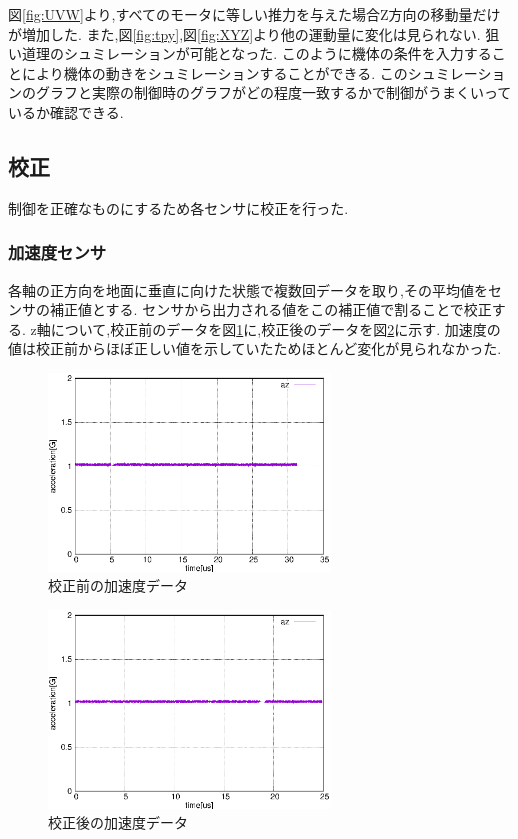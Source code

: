 \documentclass[12pt,oneside]{sotsuken_paper}
\begin{document}
図\ref{fig:UVW}より,すべてのモータに等しい推力を与えた場合Z方向の移動量だけが増加した.
また,図\ref{fig:tpy},図\ref{fig:XYZ}より他の運動量に変化は見られない.
狙い道理のシュミレーションが可能となった.
このように機体の条件を入力することにより機体の動きをシュミレーションすることができる.
このシュミレーションのグラフと実際の制御時のグラフがどの程度一致するかで制御がうまくいっているか確認できる.

\subsection{校正}
制御を正確なものにするため各センサに校正を行った.

\subsubsection{加速度センサ}
各軸の正方向を地面に垂直に向けた状態で複数回データを取り,その平均値をセンサの補正値とする.
センサから出力される値をこの補正値で割ることで校正する.
z軸について,校正前のデータを図\ref{fig:acc-calib-be}に,校正後のデータを図\ref{fig:acc-calib-af}に示す.
加速度の値は校正前からほぼ正しい値を示していたためほとんど変化が見られなかった.

\begin{figure}[htbp]
	\begin{center}
		\includegraphics[width=75mm]{image/calibration/acc-calib-be.eps}
		\caption{校正前の加速度データ}
		\label{fig:acc-calib-be}
	\end{center}
\end{figure}

\begin{figure}[htbp]
	\begin{center}
		\includegraphics[width=75mm]{image/calibration/acc-calib-af.eps}
		\caption{校正後の加速度データ}
		\label{fig:acc-calib-af}
	\end{center}
\end{figure}
\end{document}
